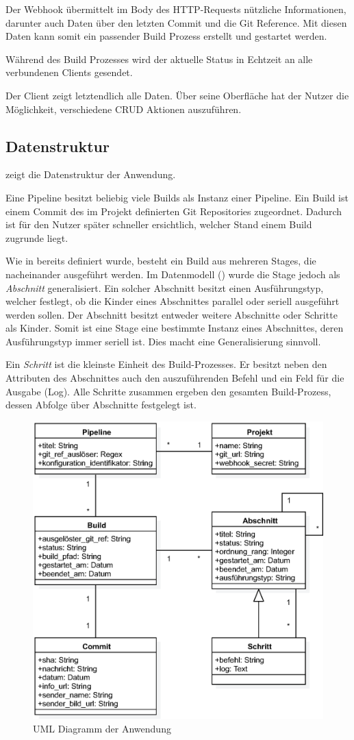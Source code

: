 Der Webhook übermittelt im Body des HTTP-Requests nützliche Informationen, darunter auch Daten über den letzten Commit und die Git Reference. Mit diesen Daten kann somit ein passender Build Prozess erstellt und gestartet werden.

Während des Build Prozesses wird der aktuelle Status in Echtzeit an alle verbundenen Clients gesendet.

Der Client zeigt letztendlich alle Daten. Über seine Oberfläche hat der Nutzer die Möglichkeit, verschiedene \ac{CRUD} Aktionen auszuführen.

\subsection{Datenstruktur}
\label{subsec:uml}

 zeigt die Datenstruktur der Anwendung.

Eine Pipeline besitzt beliebig viele Builds als Instanz einer Pipeline. Ein Build ist einem Commit des im Projekt definierten Git Repositories zugeordnet. Dadurch ist für den Nutzer später schneller ersichtlich, welcher Stand einem Build zugrunde liegt.

Wie in  bereits definiert wurde, besteht ein Build aus mehreren Stages, die nacheinander ausgeführt werden. Im Datenmodell () wurde die Stage jedoch als \emph{Abschnitt} generalisiert. Ein solcher Abschnitt besitzt einen Ausführungstyp, welcher festlegt, ob die Kinder eines Abschnittes parallel oder seriell ausgeführt werden sollen. Der Abschnitt besitzt entweder weitere Abschnitte oder Schritte als Kinder. Somit ist eine Stage eine bestimmte Instanz eines Abschnittes, deren Ausführungstyp immer seriell ist. Dies macht eine Generalisierung sinnvoll.

Ein \emph{Schritt} ist die kleinste Einheit des Build-Prozesses. Er besitzt neben den Attributen des Abschnittes auch den auszuführenden Befehl und ein Feld für die Ausgabe (Log). Alle Schritte zusammen ergeben den gesamten Build-Prozess, dessen Abfolge über Abschnitte festgelegt ist.

\begin{figure}[h]
  \caption{UML Diagramm der Anwendung}
  \label{fig:uml}
  \centering
    \includegraphics[width=\textwidth]{assets/uml}
\end{figure}
